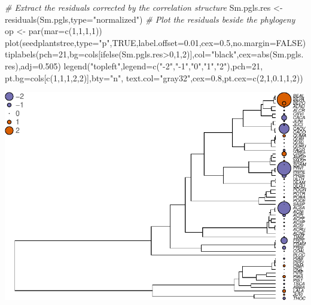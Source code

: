 \documentclass[
]{book}
\newenvironment{Shaded}{\begin{snugshade}}{\end{snugshade}}
\newcommand{\AttributeTok}[1]{\textcolor[rgb]{0.77,0.63,0.00}{#1}}
\newcommand{\CommentTok}[1]{\textcolor[rgb]{0.56,0.35,0.01}{\textit{#1}}}
\newcommand{\ConstantTok}[1]{\textcolor[rgb]{0.00,0.00,0.00}{#1}}
\newcommand{\DecValTok}[1]{\textcolor[rgb]{0.00,0.00,0.81}{#1}}
\newcommand{\FloatTok}[1]{\textcolor[rgb]{0.00,0.00,0.81}{#1}}
\newcommand{\FunctionTok}[1]{\textcolor[rgb]{0.00,0.00,0.00}{#1}}
\newcommand{\NormalTok}[1]{#1}
\newcommand{\OtherTok}[1]{\textcolor[rgb]{0.56,0.35,0.01}{#1}}
\newcommand{\SpecialCharTok}[1]{\textcolor[rgb]{0.00,0.00,0.00}{#1}}
\newcommand{\StringTok}[1]{\textcolor[rgb]{0.31,0.60,0.02}{#1}}
\begin{document}
\begin{Shaded}
\begin{Highlighting}[]
\CommentTok{\# Extract the residuals corrected by the correlation structure}
\NormalTok{Sm.pgls.res }\OtherTok{\textless{}{-}} \FunctionTok{residuals}\NormalTok{(Sm.pgls,}\AttributeTok{type=}\StringTok{"normalized"}\NormalTok{)}
\CommentTok{\# Plot the residuals beside the phylogeny}
\NormalTok{op }\OtherTok{\textless{}{-}} \FunctionTok{par}\NormalTok{(}\AttributeTok{mar=}\FunctionTok{c}\NormalTok{(}\DecValTok{1}\NormalTok{,}\DecValTok{1}\NormalTok{,}\DecValTok{1}\NormalTok{,}\DecValTok{1}\NormalTok{))}
\FunctionTok{plot}\NormalTok{(seedplantstree,}\AttributeTok{type=}\StringTok{"p"}\NormalTok{,}\ConstantTok{TRUE}\NormalTok{,}\AttributeTok{label.offset=}\FloatTok{0.01}\NormalTok{,}\AttributeTok{cex=}\FloatTok{0.5}\NormalTok{,}\AttributeTok{no.margin=}\ConstantTok{FALSE}\NormalTok{)}
\FunctionTok{tiplabels}\NormalTok{(}\AttributeTok{pch=}\DecValTok{21}\NormalTok{,}\AttributeTok{bg=}\NormalTok{cols[}\FunctionTok{ifelse}\NormalTok{(Sm.pgls.res}\SpecialCharTok{\textgreater{}}\DecValTok{0}\NormalTok{,}\DecValTok{1}\NormalTok{,}\DecValTok{2}\NormalTok{)],}\AttributeTok{col=}\StringTok{"black"}\NormalTok{,}\AttributeTok{cex=}\FunctionTok{abs}\NormalTok{(Sm.pgls.res),}\AttributeTok{adj=}\FloatTok{0.505}\NormalTok{)}
\FunctionTok{legend}\NormalTok{(}\StringTok{"topleft"}\NormalTok{,}\AttributeTok{legend=}\FunctionTok{c}\NormalTok{(}\StringTok{"{-}2"}\NormalTok{,}\StringTok{"{-}1"}\NormalTok{,}\StringTok{"0"}\NormalTok{,}\StringTok{"1"}\NormalTok{,}\StringTok{"2"}\NormalTok{),}\AttributeTok{pch=}\DecValTok{21}\NormalTok{,}
       \AttributeTok{pt.bg=}\NormalTok{cols[}\FunctionTok{c}\NormalTok{(}\DecValTok{1}\NormalTok{,}\DecValTok{1}\NormalTok{,}\DecValTok{1}\NormalTok{,}\DecValTok{2}\NormalTok{,}\DecValTok{2}\NormalTok{)],}\AttributeTok{bty=}\StringTok{"n"}\NormalTok{,}
       \AttributeTok{text.col=}\StringTok{"gray32"}\NormalTok{,}\AttributeTok{cex=}\FloatTok{0.8}\NormalTok{,}\AttributeTok{pt.cex=}\FunctionTok{c}\NormalTok{(}\DecValTok{2}\NormalTok{,}\DecValTok{1}\NormalTok{,}\FloatTok{0.1}\NormalTok{,}\DecValTok{1}\NormalTok{,}\DecValTok{2}\NormalTok{))}
\end{Highlighting}
\end{Shaded}

\includegraphics{pcm-workshop_files/figure-latex/Challenge 3 - solution-1.pdf}
\end{document}
